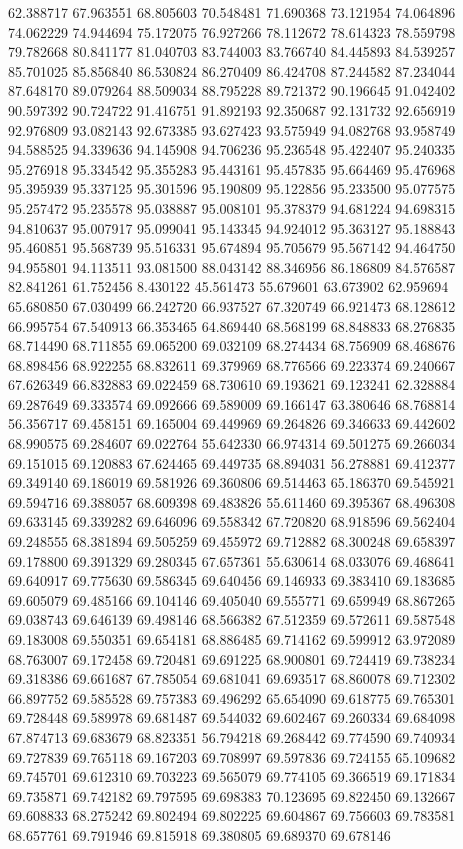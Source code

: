 62.388717
67.963551
68.805603
70.548481
71.690368
73.121954
74.064896
74.062229
74.944694
75.172075
76.927266
78.112672
78.614323
78.559798
79.782668
80.841177
81.040703
83.744003
83.766740
84.445893
84.539257
85.701025
85.856840
86.530824
86.270409
86.424708
87.244582
87.234044
87.648170
89.079264
88.509034
88.795228
89.721372
90.196645
91.042402
90.597392
90.724722
91.416751
91.892193
92.350687
92.131732
92.656919
92.976809
93.082143
92.673385
93.627423
93.575949
94.082768
93.958749
94.588525
94.339636
94.145908
94.706236
95.236548
95.422407
95.240335
95.276918
95.334542
95.355283
95.443161
95.457835
95.664469
95.476968
95.395939
95.337125
95.301596
95.190809
95.122856
95.233500
95.077575
95.257472
95.235578
95.038887
95.008101
95.378379
94.681224
94.698315
94.810637
95.007917
95.099041
95.143345
94.924012
95.363127
95.188843
95.460851
95.568739
95.516331
95.674894
95.705679
95.567142
94.464750
94.955801
94.113511
93.081500
88.043142
88.346956
86.186809
84.576587
82.841261
61.752456
8.430122
45.561473
55.679601
63.673902
62.959694
65.680850
67.030499
66.242720
66.937527
67.320749
66.921473
68.128612
66.995754
67.540913
66.353465
64.869440
68.568199
68.848833
68.276835
68.714490
68.711855
69.065200
69.032109
68.274434
68.756909
68.468676
68.898456
68.922255
68.832611
69.379969
68.776566
69.223374
69.240667
67.626349
66.832883
69.022459
68.730610
69.193621
69.123241
62.328884
69.287649
69.333574
69.092666
69.589009
69.166147
63.380646
68.768814
56.356717
69.458151
69.165004
69.449969
69.264826
69.346633
69.442602
68.990575
69.284607
69.022764
55.642330
66.974314
69.501275
69.266034
69.151015
69.120883
67.624465
69.449735
68.894031
56.278881
69.412377
69.349140
69.186019
69.581926
69.360806
69.514463
65.186370
69.545921
69.594716
69.388057
68.609398
69.483826
55.611460
69.395367
68.496308
69.633145
69.339282
69.646096
69.558342
67.720820
68.918596
69.562404
69.248555
68.381894
69.505259
69.455972
69.712882
68.300248
69.658397
69.178800
69.391329
69.280345
67.657361
55.630614
68.033076
69.468641
69.640917
69.775630
69.586345
69.640456
69.146933
69.383410
69.183685
69.605079
69.485166
69.104146
69.405040
69.555771
69.659949
68.867265
69.038743
69.646139
69.498146
68.566382
67.512359
69.572611
69.587548
69.183008
69.550351
69.654181
68.886485
69.714162
69.599912
63.972089
68.763007
69.172458
69.720481
69.691225
68.900801
69.724419
69.738234
69.318386
69.661687
67.785054
69.681041
69.693517
68.860078
69.712302
66.897752
69.585528
69.757383
69.496292
65.654090
69.618775
69.765301
69.728448
69.589978
69.681487
69.544032
69.602467
69.260334
69.684098
67.874713
69.683679
68.823351
56.794218
69.268442
69.774590
69.740934
69.727839
69.765118
69.167203
69.708997
69.597836
69.724155
65.109682
69.745701
69.612310
69.703223
69.565079
69.774105
69.366519
69.171834
69.735871
69.742182
69.797595
69.698383
70.123695
69.822450
69.132667
69.608833
68.275242
69.802494
69.802225
69.604867
69.756603
69.783581
68.657761
69.791946
69.815918
69.380805
69.689370
69.678146

